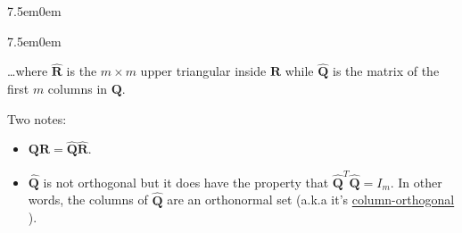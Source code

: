 \documentclass{book}
\newcommand{\hFour}{%
   \color{Cerulean}
   \fontsize{12}{14}\selectfont%
}
\newenvironment{myTindent}{%
   \begin{adjustwidth}{7.5em}{0em}%
}{%
   \end{adjustwidth}%
}
\newcommand{\udefine}[1]{%
   {\setulcolor{Red}%
   \setul{0.14em}{0.07em}%
   \ul{#1}}%
}
\newcommand{\retTwo}{\hfill\bigbreak}
\newcommand{\mMat}[1]{\mathbf{#1}}
\begin{document}
   {\begin{myTindent}\begin{myTindent} \hFour
      \dots where $\hat{\mMat{R}}$ is the $m \times m$ upper triangular inside $\mMat{R}$ while $\hat{\mMat{Q}}$ is the matrix of the first $m$ columns in $\mMat{Q}$. \retTwo
   \end{myTindent}\end{myTindent}}

   Two notes:
   \begin{itemize}
      \item $\mMat{Q}\mMat{R} = \hat{\mMat{Q}}\hat{\mMat{R}}$.
      \item $\hat{\mMat{Q}}$ is not orthogonal but it does have the property that $\hat{\mMat{Q}}^T\hat{\mMat{Q}} = I_m$. In other words, the columns of $\hat{\mMat{Q}}$ are an orthonormal set (a.k.a it's \udefine{column-orthogonal}). \retTwo
   \end{itemize}
   
\end{document}
